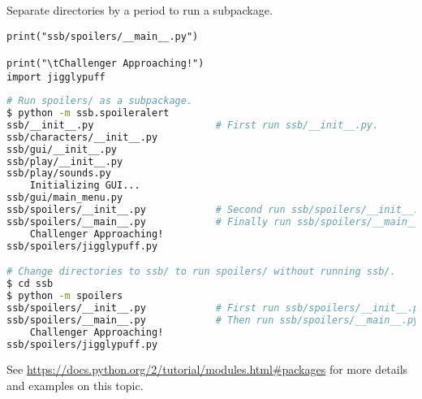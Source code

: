 Separate directories by a period to run a subpackage.

\begin{lstlisting}
print("ssb/spoilers/__main__.py")

print("\tChallenger Approaching!")
import jigglypuff
\end{lstlisting}

\begin{lstlisting}[language=bash]
# Run spoilers/ as a subpackage.
$ python -m ssb.spoileralert
ssb/__init__.py                     # First run ssb/__init__.py.
ssb/characters/__init__.py
ssb/gui/__init__.py
ssb/play/__init__.py
ssb/play/sounds.py
    Initializing GUI...
ssb/gui/main_menu.py
ssb/spoilers/__init__.py            # Second run ssb/spoilers/__init__.py.
ssb/spoilers/__main__.py            # Finally run ssb/spoilers/__main__.py.
    Challenger Approaching!
ssb/spoilers/jigglypuff.py

# Change directories to ssb/ to run spoilers/ without running ssb/.
$ cd ssb
$ python -m spoilers
ssb/spoilers/__init__.py            # First run ssb/spoilers/__init__.py.
ssb/spoilers/__main__.py            # Then run ssb/spoilers/__main__.py.
    Challenger Approaching!
ssb/spoilers/jigglypuff.py
\end{lstlisting}

See \url{https://docs.python.org/2/tutorial/modules.html\#packages} for more details and examples on this topic.
